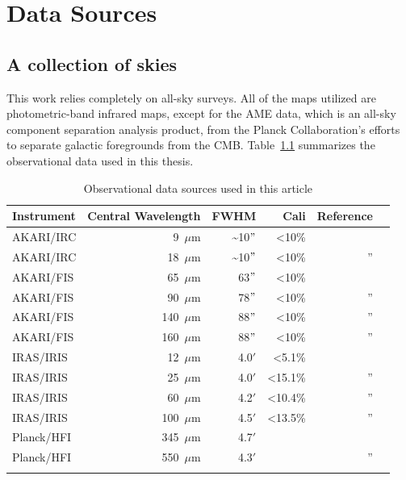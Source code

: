 
\chapter{Data Sources}
  \label{ch:datasources}

  \section{A collection of skies}
    This work relies completely on all-sky surveys. All of the maps utilized are photometric-band infrared maps, except for the AME data, which is an all-sky component separation analysis product, from the Planck Collaboration's efforts to separate galactic foregrounds from the CMB. Table~\ref{tab:data} summarizes the observational data used in this thesis.
    \begin{table}[h]
      \caption{Observational data sources used in this article}
      \centering
        \begin{tabular}{lrrrrr}
        \hline\hline
        Instrument & Central Wavelength & FWHM & Cali & Reference \\
        \hline
        AKARI/IRC & 9~$\mu$m  &  \textasciitilde{}10$"$ & \textless 10\%   & \tablefootnote{\cite{ishihara10}} \\
        AKARI/IRC & 18~$\mu$m & \textasciitilde{}10$"$  & \textless 10\%     & '' \\
        AKARI/FIS & 65~$\mu$m  & 63$"$ & \textless 10\% & \tablefootnote{\cite{doi15,takita16}} \\
        AKARI/FIS & 90~$\mu$m  & 78$"$ & \textless 10\%   & '' \\
        AKARI/FIS & 140~$\mu$m & 88$"$ & \textless 10\%   & '' \\
        AKARI/FIS & 160~$\mu$m & 88$"$ & \textless 10\%   & '' \\
        IRAS/IRIS & 12~$\mu$m   & 4.0$'$ &   \textless 5.1\%       & \tablefootnote{\cite{iris05}} \\
        IRAS/IRIS & 25~$\mu$m   & 4.0$'$ &    \textless 15.1\%      & ''\\
        IRAS/IRIS & 60~$\mu$m   & 4.2$'$ &    \textless 10.4\%      & '' \\
        IRAS/IRIS & 100~$\mu$m  & 4.5$'$ &   \textless 13.5\%       & '' \\
        Planck/HFI & 345~$\mu$m & 4.7$'$ & & \tablefootnote{\cite{hfi14viii}} \\
        Planck/HFI & 550~$\mu$m & 4.3$'$& & '' \\
        \hline
         \label{tab:data}
      \end{tabular}
    \end{table}
